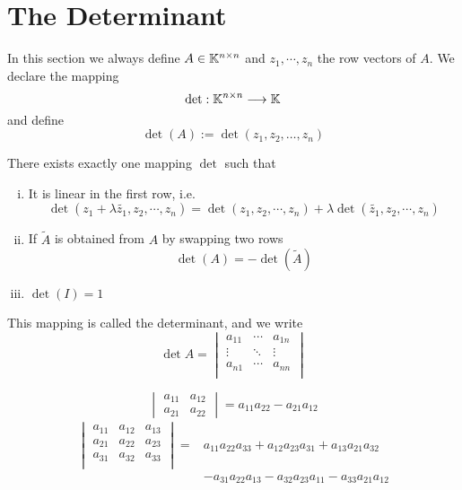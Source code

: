 \documentclass[../../script.tex]{subfiles}
\begin{document}
\section{The Determinant}

In this section we always define $A \in \mathbb{K}^{n \times n}$ and $z_1, \cdots, z_n$ the row vectors of $A$. We declare the mapping
\[
    \det: \mathbb{K}^{n \times n} \longrightarrow \mathbb{K}
\]
and define
\[
    \det(A) := \det(z_1, z_2, \dots, z_n)  
\]

\begin{defi}
    There exists exactly one mapping $\det$ such that
    \begin{enumerate}[(i)]
        \item It is linear in the first row, i.e.
        \[
            \det(z_1 + \lambda\tilde{z_1}, z_2, \cdots, z_n) = \det(z_1, z_2, \cdots, z_n) + \lambda \det(\tilde{z_1}, z_2, \cdots, z_n)  
        \]

        \item If $\tilde{A}$ is obtained from $A$ by swapping two rows
        \[
            \det(A) = -\det(\tilde{A})  
        \]

        \item $\det(I) = 1$
    \end{enumerate}
    This mapping is called the determinant, and we write
    \[
        \det A = \begin{vmatrix}
            a_{11} & \cdots & a_{1n} \\
            \vdots & \ddots & \vdots \\
            a_{n1} & \cdots & a_{nn} \\
        \end{vmatrix}  
    \]
\end{defi}

\begin{eg}
    \[
        \begin{vmatrix}
            a_{11} & a_{12} \\
            a_{21} & a_{22}
        \end{vmatrix}  
        = a_{11}a_{22} - a_{21}a_{12}
    \]
    \begin{align*}
        \begin{vmatrix}
            a_{11} & a_{12} & a_{13} \\
            a_{21} & a_{22} & a_{23} \\
            a_{31} & a_{32} & a_{33} \\
        \end{vmatrix} 
        = &a_{11}a_{22}a_{33} + a_{12}a_{23}a_{31} + a_{13}a_{21}a_{32} \\
        &- a_{31}a_{22}a_{13} - a_{32}a_{23}a_{11} - a_{33}a_{21}a_{12}  
    \end{align*}
\end{eg}
\end{document}
